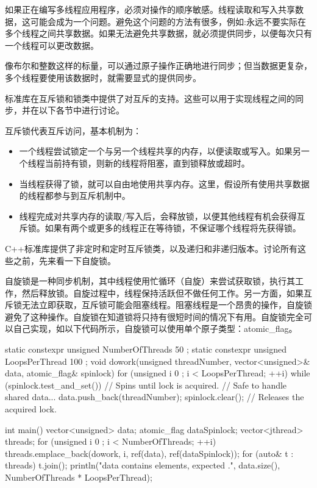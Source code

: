 
如果正在编写多线程应用程序，必须对操作的顺序敏感。线程读取和写入共享数据，这可能会成为一个问题。避免这个问题的方法有很多，例如:永远不要实际在多个线程之间共享数据。如果无法避免共享数据，就必须提供同步，以便每次只有一个线程可以更改数据。

像布尔和整数这样的标量，可以通过原子操作正确地进行同步；但当数据更复杂，多个线程要使用该数据时，就需要显式的提供同步。

标准库在互斥锁和锁类中提供了对互斥的支持。这些可以用于实现线程之间的同步，并在以下各节中进行讨论。


互斥锁代表互斥访问，基本机制为：

\begin{itemize}
\item
一个线程尝试锁定一个与另一个线程共享的内存，以便读取或写入。如果另一个线程当前持有锁，则新的线程将阻塞，直到锁释放或超时。

\item
当线程获得了锁，就可以自由地使用共享内存。这里，假设所有使用共享数据的线程都参与到互斥机制中。

\item
线程完成对共享内存的读取/写入后，会释放锁，以便其他线程有机会获得互斥锁。如果有两个或更多的线程正在等待锁，不保证哪个线程将先获得锁。
\end{itemize}

C++标准库提供了非定时和定时互斥锁类，以及递归和非递归版本。讨论所有这些之前，先来看一下自旋锁。


自旋锁是一种同步机制，其中线程使用忙循环（自旋）来尝试获取锁，执行其工作，然后释放锁。自旋过程中，线程保持活跃但不做任何工作。另一方面，如果互斥锁无法立即获取，互斥锁可能会阻塞线程。阻塞线程是一个昂贵的操作，自旋锁避免了这种操作。自旋锁在知道锁将只持有很短时间的情况下有用。自旋锁完全可以自己实现，如以下代码所示，自旋锁可以使用单个原子类型：atomic\_flag。

\begin{cpp}
static constexpr unsigned NumberOfThreads { 50 };
static constexpr unsigned LoopsPerThread { 100 };
void dowork(unsigned threadNumber, vector<unsigned>& data, atomic_flag& spinlock)
{
    for (unsigned i { 0 }; i < LoopsPerThread; ++i) {
        while (spinlock.test_and_set()) { } // Spins until lock is acquired.
        // Safe to handle shared data...
        data.push_back(threadNumber);
        spinlock.clear(); // Releases the acquired lock.
    }
}

int main()
{
    vector<unsigned> data;
    atomic_flag dataSpinlock;
    vector<jthread> threads;
    for (unsigned i { 0 }; i < NumberOfThreads; ++i) {
        threads.emplace_back(dowork, i, ref(data), ref(dataSpinlock));
    }
    for (auto& t : threads) { t.join(); }
    println("data contains {} elements, expected {}.", data.size(),
        NumberOfThreads * LoopsPerThread);
}
\end{cpp}

